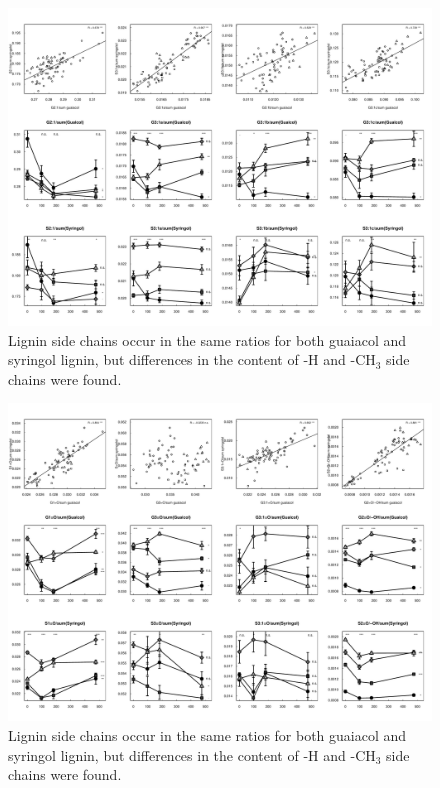 \documentclass[preprint,review,12pt]{elsarticle}
\begin{document}
\begin{figure}
\centering
{}
\includegraphics{pyrpaper-sidechainratios2}
\caption{Lignin side chains occur in the same ratios for both guaiacol and syringol lignin, but differences in the content of -H and -CH$_3$ side chains were found.}
\label{fig:sidechainratios2}
\end{figure}
\begin{figure}
\centering
{}
\includegraphics{pyrpaper-sidechainratios3}
\caption{Lignin side chains occur in the same ratios for both guaiacol and syringol lignin, but differences in the content of -H and -CH$_3$ side chains were found.}
\label{fig:sidechainratios3}
\end{figure}
\end{document}
